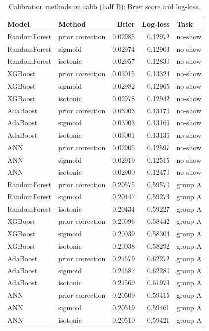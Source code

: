 \begin{table}[htbp]
\caption{Calibration methods on calib (half B): Brier score and log-loss.}
\label{tab:calibration}
\begin{tabular}{llrrl}
\toprule
Model & Method & Brier & Log-loss & Task \\
\midrule
RandomForest & prior correction & 0.02985 & 0.12972 & no-show \\
RandomForest & sigmoid & 0.02974 & 0.12903 & no-show \\
RandomForest & isotonic & 0.02957 & 0.12830 & no-show \\
XGBoost & prior correction & 0.03015 & 0.13324 & no-show \\
XGBoost & sigmoid & 0.02982 & 0.12965 & no-show \\
XGBoost & isotonic & 0.02978 & 0.12942 & no-show \\
AdaBoost & prior correction & 0.03003 & 0.13170 & no-show \\
AdaBoost & sigmoid & 0.03003 & 0.13166 & no-show \\
AdaBoost & isotonic & 0.03001 & 0.13136 & no-show \\
ANN & prior correction & 0.02905 & 0.12597 & no-show \\
ANN & sigmoid & 0.02919 & 0.12515 & no-show \\
ANN & isotonic & 0.02900 & 0.12470 & no-show \\
RandomForest & prior correction & 0.20575 & 0.59570 & group A \\
RandomForest & sigmoid & 0.20447 & 0.59273 & group A \\
RandomForest & isotonic & 0.20434 & 0.59227 & group A \\
XGBoost & prior correction & 0.20096 & 0.58442 & group A \\
XGBoost & sigmoid & 0.20039 & 0.58304 & group A \\
XGBoost & isotonic & 0.20038 & 0.58292 & group A \\
AdaBoost & prior correction & 0.21679 & 0.62272 & group A \\
AdaBoost & sigmoid & 0.21687 & 0.62280 & group A \\
AdaBoost & isotonic & 0.21569 & 0.61979 & group A \\
ANN & prior correction & 0.20509 & 0.59415 & group A \\
ANN & sigmoid & 0.20519 & 0.59461 & group A \\
ANN & isotonic & 0.20510 & 0.59421 & group A \\
\bottomrule
\end{tabular}
\end{table}
